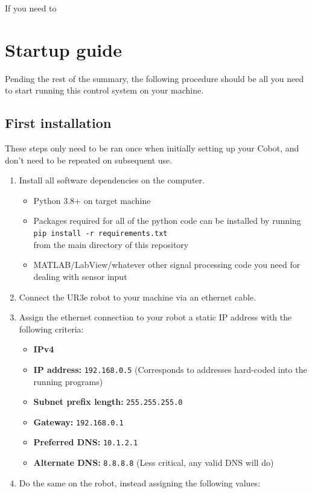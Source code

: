 \documentclass[11pt]{article}
\begin{document}
If you need to 

\section{Startup guide}\label{sec:startup}
Pending the rest of the summary, the following procedure should be all you need to start running this control system on your machine.
\subsection{First installation}
These steps only need to be ran once when initially setting up your Cobot, and don't need to be repeated on subsequent use.
\begin{enumerate}
    \item Install all software dependencies on the computer.
    \begin{itemize}
        \item Python 3.8+ on target machine
        \item Packages required for all of the python code can be installed by running \\ \texttt{pip install -r requirements.txt} \\ from the main directory of this repository
        \item MATLAB/LabView/whatever other signal processing code you need for dealing with sensor input
    \end{itemize}
    \item Connect the UR3e robot to your machine via an ethernet cable.
    \item Assign the ethernet connection to your robot a static IP address with the following criteria:
    \begin{itemize}
        \item \textbf{IPv4}
        \item \textbf{IP address:} \texttt{192.168.0.5} (Corresponds to addresses hard-coded into the running programs)
        \item \textbf{Subnet prefix length:} \texttt{255.255.255.0}
        \item \textbf{Gateway:} \texttt{192.168.0.1}
        \item \textbf{Preferred DNS:}  \texttt{10.1.2.1}
        \item \textbf{Alternate DNS:} \texttt{8.8.8.8} (Less critical, any valid DNS will do)
    \end{itemize}
    \item Do the same on the robot, instead assigning the following values:

\end{enumerate}
\end{document}
